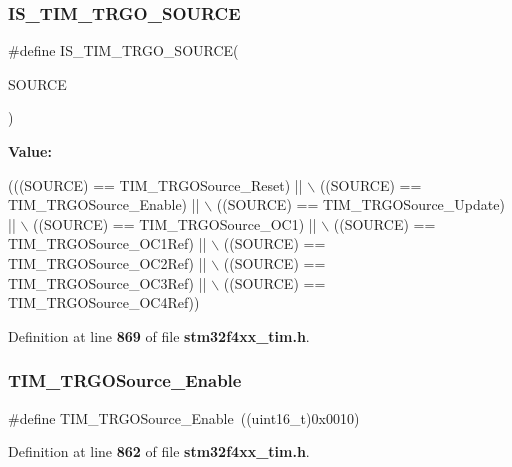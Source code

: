 \subsubsection{I\+S\+\_\+\+T\+I\+M\+\_\+\+T\+R\+G\+O\+\_\+\+S\+O\+U\+R\+CE}
{\footnotesize\ttfamily \#define I\+S\+\_\+\+T\+I\+M\+\_\+\+T\+R\+G\+O\+\_\+\+S\+O\+U\+R\+CE(\begin{DoxyParamCaption}\item[{}]{S\+O\+U\+R\+CE }\end{DoxyParamCaption})}

{\bfseries Value\+:}
\begin{DoxyCode}
(((SOURCE) == TIM_TRGOSource_Reset) || \(\backslash\)
                                    ((SOURCE) == TIM_TRGOSource_Enable) || \(\backslash\)
                                    ((SOURCE) == TIM_TRGOSource_Update) || \(\backslash\)
                                    ((SOURCE) == TIM_TRGOSource_OC1) || \(\backslash\)
                                    ((SOURCE) == TIM_TRGOSource_OC1Ref) || \(\backslash\)
                                    ((SOURCE) == TIM_TRGOSource_OC2Ref) || \(\backslash\)
                                    ((SOURCE) == TIM_TRGOSource_OC3Ref) || \(\backslash\)
                                    ((SOURCE) == TIM_TRGOSource_OC4Ref))
\end{DoxyCode}


Definition at line \textbf{ 869} of file \textbf{ stm32f4xx\+\_\+tim.\+h}.

\mbox{\label{group__TIM__Trigger__Output__Source_gaa228ba6cfafcf676e33e3ee35cb7fc1c}} 
\subsubsection{T\+I\+M\+\_\+\+T\+R\+G\+O\+Source\+\_\+\+Enable}
{\footnotesize\ttfamily \#define T\+I\+M\+\_\+\+T\+R\+G\+O\+Source\+\_\+\+Enable~((uint16\+\_\+t)0x0010)}



Definition at line \textbf{ 862} of file \textbf{ stm32f4xx\+\_\+tim.\+h}.

\mbox{\label{group__TIM__Trigger__Output__Source_ga2d044b472c021f5484b9f71eb9ca69f1}} 
